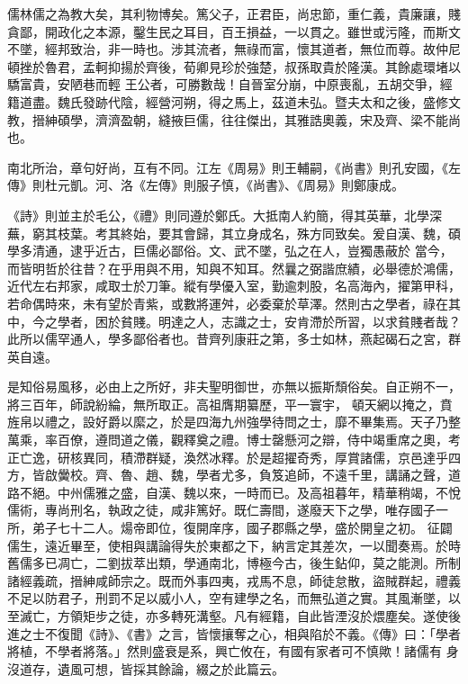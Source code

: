 
\begin{pinyinscope}

 儒林儒之為教大矣，其利物博矣。篤父子，正君臣，尚忠節，重仁義，貴廉讓，賤貪鄙，開政化之本源，鑿生民之耳目，百王損益，一以貫之。雖世或污隆，而斯文不墜，經邦致治，非一時也。涉其流者，無祿而富，懷其道者，無位而尊。故仲尼頓挫於魯君，孟軻抑揚於齊後，荀卿見珍於強楚，叔孫取貴於隆漢。其餘處環堵以驕富貴，安陋巷而輕
 王公者，可勝數哉！自晉室分崩，中原喪亂，五胡交爭，經籍道盡。魏氏發跡代陰，經營河朔，得之馬上，茲道未弘。暨夫太和之後，盛修文教，搢紳碩學，濟濟盈朝，縫掖巨儒，往往傑出，其雅誥奧義，宋及齊、梁不能尚也。



 南北所治，章句好尚，互有不同。江左《周易》則王輔嗣，《尚書》則孔安國，《左傳》則杜元凱。河、洛《左傳》則服子慎，《尚書》、《周易》則鄭康成。



 《詩》則並主於毛公，《禮》則同遵於鄭氏。大抵南人約簡，得其英華，北學深蕪，窮其枝葉。考其終始，要其會歸，其立身成名，殊方同致矣。爰自漢、魏，碩學多清通，逮乎近古，巨儒必鄙俗。文、武不墜，弘之在人，豈獨愚蔽於
 當今，而皆明哲於往昔？在乎用與不用，知與不知耳。然曩之弼諧庶績，必舉德於鴻儒，近代左右邦家，咸取士於刀筆。縱有學優入室，勤逾刺股，名高海內，擢第甲科，若命偶時來，未有望於青紫，或數將運舛，必委棄於草澤。然則古之學者，祿在其中，今之學者，困於貧賤。明達之人，志識之士，安肯滯於所習，以求貧賤者哉？此所以儒罕通人，學多鄙俗者也。昔齊列康莊之第，多士如林，燕起碣石之宮，群英自遠。



 是知俗易風移，必由上之所好，非夫聖明御世，亦無以振斯頹俗矣。自正朔不一，將三百年，師說紛綸，無所取正。高祖膺期纂歷，平一寰宇，
 頓天網以掩之，賁旌帛以禮之，設好爵以縻之，於是四海九州強學待問之士，靡不畢集焉。天子乃整萬乘，率百僚，遵問道之儀，觀釋奠之禮。博士罄懸河之辯，侍中竭重席之奧，考正亡逸，研核異同，積滯群疑，渙然冰釋。於是超擢奇秀，厚賞諸儒，京邑達乎四方，皆啟黌校。齊、魯、趙、魏，學者尤多，負笈追師，不遠千里，講誦之聲，道路不絕。中州儒雅之盛，自漢、魏以來，一時而已。及高祖暮年，精華稍竭，不悅儒術，專尚刑名，執政之徒，咸非篤好。既仁壽間，遂廢天下之學，唯存國子一所，弟子七十二人。煬帝即位，復開庠序，國子郡縣之學，盛於開皇之初。
 征闢儒生，遠近畢至，使相與講論得失於東都之下，納言定其差次，一以聞奏焉。於時舊儒多已凋亡，二劉拔萃出類，學通南北，博極今古，後生鉆仰，莫之能測。所制諸經義疏，搢紳咸師宗之。既而外事四夷，戎馬不息，師徒怠散，盜賊群起，禮義不足以防君子，刑罰不足以威小人，空有建學之名，而無弘道之實。其風漸墜，以至滅亡，方領矩步之徒，亦多轉死溝壑。凡有經籍，自此皆湮沒於煨塵矣。遂使後進之士不復聞《詩》、《書》之言，皆懷攘奪之心，相與陷於不義。《傳》曰：「學者將植，不學者將落。」然則盛衰是系，興亡攸在，有國有家者可不慎歟！諸儒有
 身沒道存，遺風可想，皆採其餘論，綴之於此篇云。




\end{pinyinscope}
